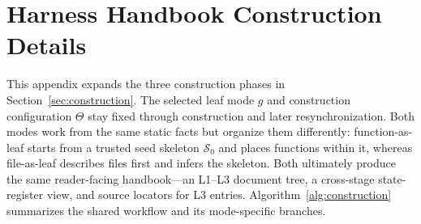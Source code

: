 \documentclass[]{ailab}
\newcommand{\hbsmall}{\textsf{function-as-leaf}}
\newcommand{\hblarge}{\textsf{file-as-leaf}}
\begin{document}
\section{Harness Handbook Construction Details}
\label{app:construction-details}

This appendix expands the three construction phases in
Section~\ref{sec:construction}. The selected leaf mode $g$ and construction
configuration $\Theta$ stay fixed through construction and later
resynchronization. Both modes work from the same static facts but organize them
differently: \hbsmall{} starts from a trusted seed skeleton $\mathcal{S}_0$ and
places functions within it, whereas \hblarge{} describes files first and infers
the skeleton. Both ultimately produce the same reader-facing handbook---an
L1--L3 document tree, a cross-stage state-register view, and source locators for
L3 entries. Algorithm~\ref{alg:construction} summarizes the shared workflow and
its mode-specific branches.
\end{document}
